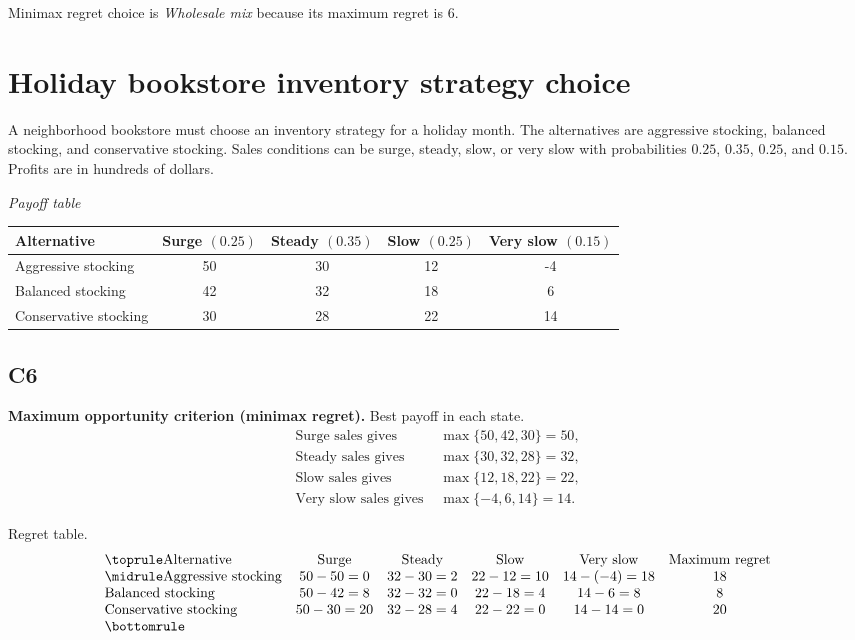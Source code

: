 \begin{ExamProblems}
		Minimax regret choice is \emph{Wholesale mix} because its maximum regret is $6$.

		\item
		\section{Holiday bookstore inventory strategy choice}
		A neighborhood bookstore must choose an inventory strategy for a holiday month. The alternatives are aggressive stocking, balanced stocking, and conservative stocking. Sales conditions can be surge, steady, slow, or very slow with probabilities $0.25$, $0.35$, $0.25$, and $0.15$. Profits are in hundreds of dollars.

		\begin{center}
			\textit{Payoff table}\\
			\begin{tabular}{l c c c c}
				\toprule
				Alternative & Surge $(0.25)$ & Steady $(0.35)$ & Slow $(0.25)$ & Very slow $(0.15)$ \\
				\midrule
				Aggressive stocking & 50 & 30 & 12 & -4 \\
				Balanced stocking & 42 & 32 & 18 & 6 \\
				Conservative stocking & 30 & 28 & 22 & 14 \\
				\bottomrule
			\end{tabular}
		\end{center}

		\subsection*{C6}
		\textbf{Maximum opportunity criterion (minimax regret).} Best payoff in each state.
		\[
		\begin{aligned}
		\text{Surge sales gives } &\max\{50,42,30\}=50,\\
		\text{Steady sales gives } &\max\{30,32,28\}=32,\\
		\text{Slow sales gives } &\max\{12,18,22\}=22,\\
		\text{Very slow sales gives } &\max\{-4,6,14\}=14.
		\end{aligned}
		\]

		Regret table.
		\[
		\begin{array}{lccccc}
			\toprule
			\text{Alternative} & \text{Surge} & \text{Steady} & \text{Slow} & \text{Very slow} & \text{Maximum regret}\\
			\midrule
			\text{Aggressive stocking} & 50-50=0 & 32-30=2 & 22-12=10 & 14-(-4)=18 & 18\\
			\text{Balanced stocking} & 50-42=8 & 32-32=0 & 22-18=4 & 14-6=8 & 8\\
			\text{Conservative stocking} & 50-30=20 & 32-28=4 & 22-22=0 & 14-14=0 & 20\\
			\bottomrule
		\end{array}
		\]


\end{ExamProblems}
